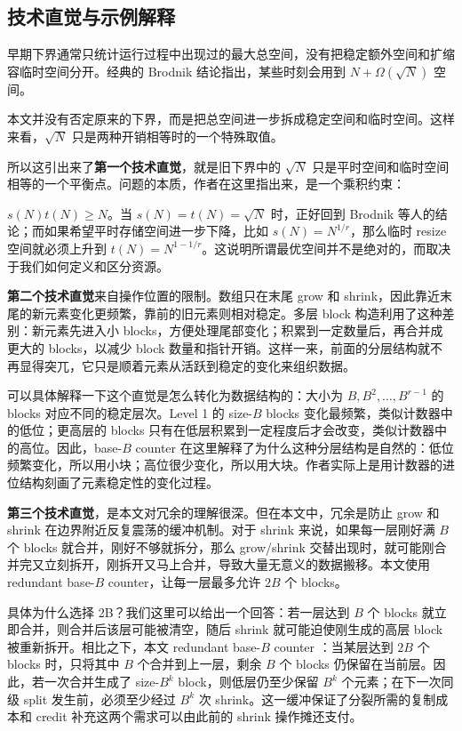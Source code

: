 \documentclass[12pt,a4paper]{article}
\begin{document}
\subsection{技术直觉与示例解释}

早期下界通常只统计运行过程中出现过的最大总空间，没有把稳定额外空间和扩缩容临时空间分开。经典的 Brodnik 结论指出，某些时刻会用到 $N+\Omega(\sqrt{N})$ 空间。

本文并没有否定原来的下界，而是把总空间进一步拆成稳定空间和临时空间。这样来看，$\sqrt N$ 只是两种开销相等时的一个特殊取值。

所以这引出来了\textbf{第一个技术直觉}，就是旧下界中的 $\sqrt{N}$ 只是平时空间和临时空间相等的一个平衡点。问题的本质，作者在这里指出来，是一个乘积约束：

$s(N)t(N)\ge N$。当 $s(N)=t(N)=\sqrt N$ 时，正好回到 Brodnik 等人的结论；而如果希望平时存储空间进一步下降，比如 $s(N)=N^{1/r}$，那么临时 resize 空间就必须上升到 $t(N)=N^{1-1/r}$。这说明所谓最优空间并不是绝对的，而取决于我们如何定义和区分资源。

\textbf{第二个技术直觉}来自操作位置的限制。数组只在末尾 grow 和 shrink，因此靠近末尾的新元素变化更频繁，靠前的旧元素则相对稳定。多层 block 构造利用了这种差别：新元素先进入小 blocks，方便处理尾部变化；积累到一定数量后，再合并成更大的 blocks，以减少 block 数量和指针开销。这样一来，前面的分层结构就不再显得突兀，它只是顺着元素从活跃到稳定的变化来组织数据。

可以具体解释一下这个直觉是怎么转化为数据结构的：大小为 $B,B^2,\ldots,B^{r-1}$ 的 blocks 对应不同的稳定层次。Level 1 的 size-$B$ blocks 变化最频繁，类似计数器中的低位；更高层的 blocks 只有在低层积累到一定程度后才会改变，类似计数器中的高位。因此，base-$B$ counter 在这里解释了为什么这种分层结构是自然的：低位频繁变化，所以用小块；高位很少变化，所以用大块。作者实际上是用计数器的进位结构刻画了元素稳定性的变化过程。

\textbf{第三个技术直觉}，是本文对冗余的理解很深。但在本文中，冗余是防止 grow 和 shrink 在边界附近反复震荡的缓冲机制。对于 shrink 来说，如果每一层刚好满 $B$ 个 blocks 就合并，刚好不够就拆分，那么 grow/shrink 交替出现时，就可能刚合并完又立刻拆开，刚拆开又马上合并，导致大量无意义的数据搬移。本文使用 redundant base-$B$ counter，让每一层最多允许 $2B$ 个 blocks。

具体为什么选择 2B？我们这里可以给出一个回答：若一层达到 $B$ 个 blocks 就立即合并，则合并后该层可能被清空，随后 shrink 就可能迫使刚生成的高层 block 被重新拆开。相比之下，本文 redundant base-$B$ counter ：当某层达到 $2B$ 个 blocks 时，只将其中 $B$ 个合并到上一层，剩余 $B$ 个 blocks 仍保留在当前层。因此，若一次合并生成了 size-$B^k$ block，则低层仍至少保留 $B^k$ 个元素；在下一次同级 split 发生前，必须至少经过 $B^k$ 次 shrink。这一缓冲保证了分裂所需的复制成本和 credit 补充这两个需求可以由此前的 shrink 操作摊还支付。
\end{document}
